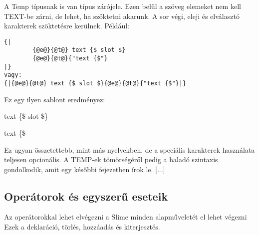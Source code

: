 A Temp típusnak is van típus zárójele. 
Ezen belül a szöveg elemeket nem kell TEXT-be zárni, de lehet, ha szöktetni akarunk. 
A sor végi, eleji és elválasztó karakterek szöktetésre kerülnek. Például:\begin{verbatim}
{| 
		{@e@}{@t@} text {$ slot $} 
		{@e@}{@t@}{"text {$"}
|}
vagy:
{|{@e@}{@t@} text {$ slot $}{@e@}{@t@}{"text {$"}|}
\end{verbatim}Ez egy ilyen sablont eredményez:

		text \{\$ slot \$\}
		
		text \{\$ 
		
Ez ugyan összetettebb, mint más nyelvekben, de a speciális karakterek használata teljesen opcionális.
A TEMP-ek tömörségéről pedig a haladó szintaxis gondolkodik, amit egy későbbi fejezetben írok le. [...]


\subsection{Operátorok és egyszerű eseteik}
Az operátorokkal lehet elvégezni a Slime minden alapműveletét el lehet végezni
Ezek a deklaráció, törlés, hozzáadás és kiterjesztés. 

